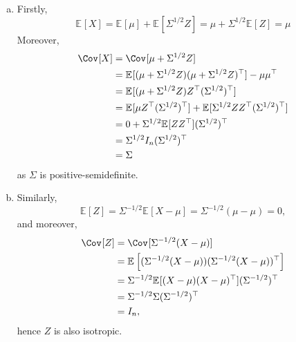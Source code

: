 \begin{answer}
	\begin{enumerate}[(a)]
		\item Firstly,
		      \[
			      \mathbb{E}_{}[X]
			      = \mathbb{E}_{}[\mu ] + \mathbb{E}_{}[\Sigma ^{1 / 2} Z]
			      = \mu + \Sigma ^{1 / 2} \mathbb{E}_{}[Z]
			      = \mu
		      \]
		      Moreover,
		      \[
			      \begin{split}
				      \Cov_{}[X]
				       & = \Cov_{}[\mu + \Sigma ^{1 / 2} Z]                                                                                            \\
				       & = \mathbb{E}_{}[(\mu + \Sigma ^{1 / 2} Z) (\mu + \Sigma ^{1 / 2} Z)^{\top} ] - \mu \mu ^{\top}                                \\
				       & = \mathbb{E}_{}[(\mu + \Sigma ^{1 / 2}Z) Z^{\top} (\Sigma ^{1 / 2})^{\top} ]                                                  \\
				       & = \mathbb{E}_{}[\mu Z^{\top} (\Sigma ^{1 / 2})^{\top} ] + \mathbb{E}_{}[\Sigma ^{1 / 2} Z Z^{\top} (\Sigma ^{1 / 2})^{\top} ] \\
				       & = 0 + \Sigma ^{1 / 2} \mathbb{E}_{}[Z Z^{\top} ] (\Sigma ^{1 / 2})^{\top}                                                     \\
				       & = \Sigma ^{1 / 2} I_n (\Sigma ^{1 / 2})^{\top}                                                                                \\
				       & = \Sigma
			      \end{split}
		      \]
		      as \(\Sigma \) is positive-semidefinite.
		\item Similarly,
		      \[
			      \mathbb{E}_{}[Z]
			      = \Sigma ^{-1 / 2} \mathbb{E}_{}[X - \mu ]
			      = \Sigma ^{-1 / 2} (\mu - \mu )
			      = 0,
		      \]
		      and moreover,
		      \[
			      \begin{split}
				      \Cov_{}[Z]
				       & = \Cov_{}[\Sigma ^{-1 / 2} (X - \mu )]                                                          \\
				       & = \mathbb{E}_{}\left[(\Sigma ^{-1 / 2} (X - \mu )) (\Sigma ^{-1 / 2} (X - \mu ))^{\top} \right] \\
				       & = \Sigma ^{-1 / 2} \mathbb{E}_{}[(X - \mu )(X - \mu )^{\top} ] (\Sigma ^{-1 / 2}) ^{\top}       \\
				       & = \Sigma ^{-1 / 2} \Sigma (\Sigma ^{-1 / 2}) ^{\top}                                            \\
				       & = I_n,
			      \end{split}
		      \]
		      hence \(Z\) is also isotropic.
	\end{enumerate}
\end{answer}

